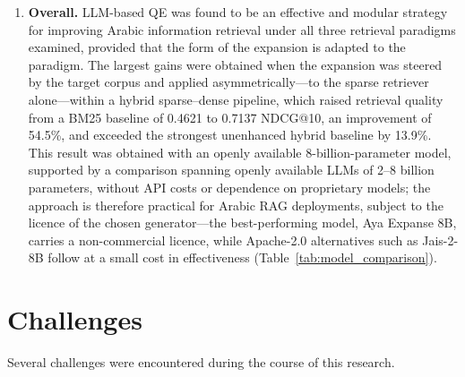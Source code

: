 \begin{enumerate}[label=\roman*.]
    \item \textbf{Overall.} LLM-based QE was found to be an effective and modular strategy for improving Arabic information retrieval under all three retrieval paradigms examined, provided that the form of the expansion is adapted to the paradigm. The largest gains were obtained when the expansion was steered by the target corpus and applied asymmetrically---to the sparse retriever alone---within a hybrid sparse--dense pipeline, which raised retrieval quality from a BM25 baseline of 0.4621 to 0.7137 NDCG@10, an improvement of 54.5\%, and exceeded the strongest unenhanced hybrid baseline by 13.9\%. This result was obtained with an openly available 8-billion-parameter model, supported by a comparison spanning openly available LLMs of 2--8 billion parameters, without API costs or dependence on proprietary models; the approach is therefore practical for Arabic RAG deployments, subject to the licence of the chosen generator---the best-performing model, Aya Expanse 8B, carries a non-commercial licence, while Apache-2.0 alternatives such as Jais-2-8B follow at a small cost in effectiveness (Table~\ref{tab:model_comparison}).
\end{enumerate}

\section{Challenges}
\label{sec:challenges}

Several challenges were encountered during the course of this research.

